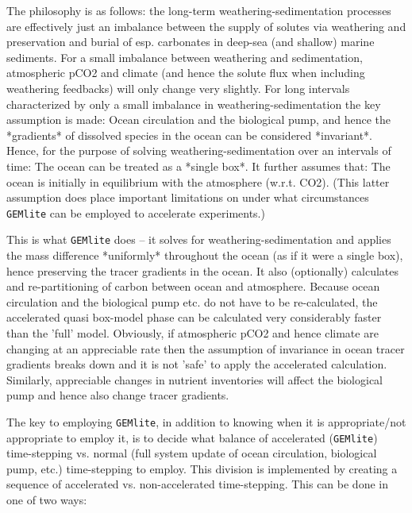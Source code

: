 \documentclass[10pt,twoside]{article}
\begin{document}
The philosophy is as follows: the long-term weathering-sedimentation processes are effectively just an imbalance between the supply of solutes via weathering and preservation and burial of esp. carbonates in deep-sea (and shallow) marine sediments. For a small imbalance between weathering and sedimentation, atmospheric pCO2 and climate (and hence the solute flux when including weathering feedbacks) will only change very slightly. For long intervals characterized by only a small imbalance in weathering-sedimentation the key assumption is made:
Ocean circulation and the biological pump, and hence the *gradients* of dissolved species in the ocean can be considered *invariant*.
Hence, for the purpose of solving weathering-sedimentation over an intervals of time:
The ocean can be treated as a *single box*.
It further assumes that:
The ocean is initially in equilibrium with the atmosphere (w.r.t. CO2).
(This latter assumption does place important limitations on under what circumstances \texttt{GEMlite} can be employed to accelerate experiments.)

This is what \texttt{GEMlite} does -- it solves for weathering-sedimentation and applies the mass difference *uniformly* throughout the ocean (as if it were a single box), hence preserving the tracer gradients in the ocean. It also (optionally) calculates and re-partitioning of carbon between ocean and atmosphere. Because ocean circulation and the biological pump etc. do not have to be re-calculated, the accelerated quasi box-model phase can be calculated very considerably faster than the 'full' model.
Obviously, if atmospheric pCO2 and hence climate are changing at an appreciable rate then the assumption of invariance in ocean tracer gradients breaks down and it is not 'safe' to apply the accelerated calculation. Similarly, appreciable changes in nutrient inventories will affect the biological pump and hence also change tracer gradients.

The key to employing \texttt{GEMlite}, in addition to knowing when it is appropriate/not appropriate to employ it, is to decide what balance of accelerated (\texttt{GEMlite}) time-stepping vs. normal (full system update of ocean circulation, biological pump, etc.) time-stepping to employ. This division is implemented by creating a sequence of accelerated vs. non-accelerated time-stepping. This can be done in one of two ways:
\end{document}
